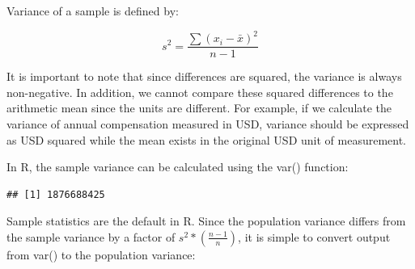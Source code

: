 \documentclass[]{book}
\newenvironment{Shaded}{\begin{snugshade}}{\end{snugshade}}
\newcommand{\CommentTok}[1]{\textcolor[rgb]{0.56,0.35,0.01}{\textit{#1}}}
\newcommand{\DecValTok}[1]{\textcolor[rgb]{0.00,0.00,0.81}{#1}}
\newcommand{\KeywordTok}[1]{\textcolor[rgb]{0.13,0.29,0.53}{\textbf{#1}}}
\newcommand{\NormalTok}[1]{#1}
\newcommand{\OperatorTok}[1]{\textcolor[rgb]{0.81,0.36,0.00}{\textbf{#1}}}
\newcommand{\StringTok}[1]{\textcolor[rgb]{0.31,0.60,0.02}{#1}}
\begin{document}
Variance of a sample is defined by:

\[ s^{2} = \frac{\sum (x_{i}-\bar{x})^{2}}{n-1} \]

It is important to note that since differences are squared, the variance is always non-negative. In addition, we cannot compare these squared differences to the arithmetic mean since the units are different. For example, if we calculate the variance of annual compensation measured in USD, variance should be expressed as USD squared while the mean exists in the original USD unit of measurement.

In R, the sample variance can be calculated using the var() function:

\begin{Shaded}
\end{Shaded}

\begin{verbatim}
## [1] 1876688425
\end{verbatim}

Sample statistics are the default in R. Since the population variance differs from the sample variance by a factor of \(s^2 * (\frac{n - 1}{n})\), it is simple to convert output from var() to the population variance:

\begin{Shaded}
\end{Shaded}
\end{document}
